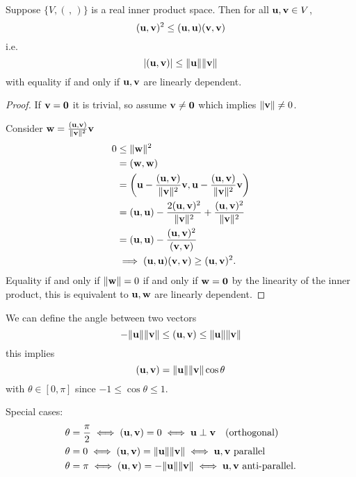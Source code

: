 \documentclass[10pt, a4paper]{article}
\begin{document}
\begin{theorem}
    Suppose $\{V, (\,,\,)\}$ is a real inner product space.
    Then for all $\mathbf{u}, \mathbf{v} \in V$,
    \[
    (\mathbf{u}, \mathbf{v}) ^ 2 \leq (\mathbf{u}, \mathbf{u})(\mathbf{v}, \mathbf{v})
    \]
    i.e.
    \[
    |(\mathbf{u}, \mathbf{v})| \leq \|\mathbf{u}\|\|\mathbf{v}\|
    \]
    with equality if and only if $\mathbf{u}, \mathbf{v}$ are linearly dependent.
    
    \begin{proof}
        If $\mathbf{v} = \mathbf{0}$ it is trivial,
        so assume $\mathbf{v} \neq \mathbf{0}$ which implies $\|\mathbf{v}\| \neq 0$.

        Consider $\mathbf{w} = \frac{(\mathbf{u}, \mathbf{v})}{\|\mathbf{v}\| ^ 2}\mathbf{v}$
        \begin{align*}
            0 &\leq \|\mathbf{w}\| ^ 2 \\
            &= (\mathbf{w}, \mathbf{w}) \\
            &= \left(\mathbf{u} - \frac{(\mathbf{u}, \mathbf{v})}{\|\mathbf{v}\| ^ 2}\mathbf{v}, \mathbf{u} - \frac{(\mathbf{u}, \mathbf{v})}{\|\mathbf{v}\| ^ 2}\mathbf{v}\right) \\
            &= (\mathbf{u}, \mathbf{u}) - \frac{2(\mathbf{u}, \mathbf{v}) ^ 2}{\|\mathbf{v}\| ^ 2} + \frac{(\mathbf{u}, \mathbf{v}) ^ 2}{\|\mathbf{v}\| ^ 2} \\
            &= (\mathbf{u}, \mathbf{u}) - \frac{(\mathbf{u}, \mathbf{v}) ^ 2}{(\mathbf{v}, \mathbf{v})} \\
            &\implies (\mathbf{u}, \mathbf{u})(\mathbf{v}, \mathbf{v}) \geq (\mathbf{u}, \mathbf{v}) ^ 2.
        \end{align*}
        Equality if and only if $\|\mathbf{w}\| = 0$ if and only if $\mathbf{w} = \mathbf{0}$ by the linearity of the inner product,
        this is equivalent to $\mathbf{u}, \mathbf{w}$ are linearly dependent.
    \end{proof}
\end{theorem}

\begin{corollary}
    We can define the angle between two vectors
    \[
    -\|\mathbf{u}\|\|\mathbf{v}\| \leq (\mathbf{u}, \mathbf{v}) \leq \|\mathbf{u}\|\|\mathbf{v}\|
    \]
    this implies
    \[
    (\mathbf{u}, \mathbf{v}) = \|\mathbf{u}\|\|\mathbf{v}\|\cos{\theta}
    \]
    with $\theta \in [0, \pi]$ since $-1 \leq \cos{\theta} \leq 1$.

    Special cases:
    \begin{align*}
        \theta &= \frac{\pi}{2} \iff (\mathbf{u}, \mathbf{v}) = 0 \iff \mathbf{u} \perp \mathbf{v}\quad(\text{orthogonal}) \\
        \theta &= 0 \iff (\mathbf{u}, \mathbf{v}) = \|\mathbf{u}\|\|\mathbf{v}\| \iff \mathbf{u}, \mathbf{v} \text{ parallel} \\
        \theta &= \pi \iff (\mathbf{u}, \mathbf{v}) = -\|\mathbf{u}\|\|\mathbf{v}\| \iff \mathbf{u}, \mathbf{v}\text{ anti-parallel}.
    \end{align*}
\end{corollary}
\end{document}
